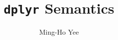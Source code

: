 \documentclass{article}
\title{\texttt{dplyr} Semantics}
\author{Ming-Ho Yee}
\begin{document}
\maketitle

\ottall{}
\end{document}
